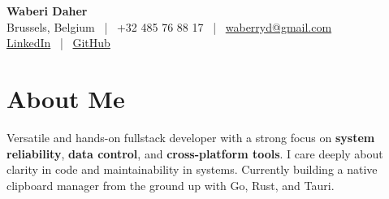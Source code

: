 \documentclass[11pt,a4paper]{article}
\begin{document}
\begin{center}
    {\LARGE \textbf{Waberi Daher}} \\[2pt]
    Brussels, Belgium ~|~ +32 485 76 88 17 ~|~ \href{mailto:waberryd@gmail.com}{waberryd@gmail.com} \\[1pt]
    \href{https://www.linkedin.com/in/waberi-daher}{LinkedIn} ~|~ \href{https://github.com/berrythewa}{GitHub}
\end{center}
\vspace{0.5em}

\section*{About Me}
\justifying
Versatile and hands-on fullstack developer with a strong focus on \textbf{system reliability}, \textbf{data control}, and \textbf{cross-platform tools}. I care deeply about clarity in code and maintainability in systems. Currently building a native clipboard manager from the ground up with Go, Rust, and Tauri.

\vspace{1.5em}
\end{document}
